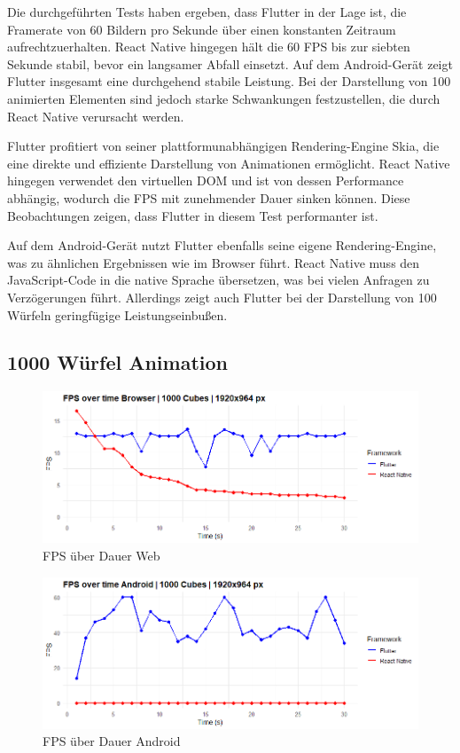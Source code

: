 Die durchgeführten Tests haben ergeben, dass Flutter in der Lage ist, die Framerate von 60 Bildern pro Sekunde über einen konstanten Zeitraum aufrechtzuerhalten. React Native hingegen hält die 60 FPS bis zur siebten Sekunde stabil, bevor ein langsamer Abfall einsetzt. Auf dem Android-Gerät zeigt Flutter insgesamt eine durchgehend stabile Leistung. Bei der Darstellung von 100 animierten Elementen sind jedoch starke Schwankungen festzustellen, die durch React Native verursacht werden.

Flutter profitiert von seiner plattformunabhängigen Rendering-Engine Skia, die eine direkte und effiziente Darstellung von Animationen ermöglicht. React Native hingegen verwendet den virtuellen DOM und ist von dessen Performance abhängig, wodurch die FPS mit zunehmender Dauer sinken können. Diese Beobachtungen zeigen, dass Flutter in diesem Test performanter ist.

Auf dem Android-Gerät nutzt Flutter ebenfalls seine eigene Rendering-Engine, was zu ähnlichen Ergebnissen wie im Browser führt. React Native muss den JavaScript-Code in die native Sprache übersetzen, was bei vielen Anfragen zu Verzögerungen führt. Allerdings zeigt auch Flutter bei der Darstellung von 100 Würfeln geringfügige Leistungseinbußen.

\newpage
\subsection{1000 Würfel Animation}

\begin{figure}[H]
    \centering
    \includegraphics[width=1\linewidth]{images/web/1000Cubes.png}
    \caption{FPS über Dauer Web}
\end{figure}

\begin{figure}[H]
    \centering
    \includegraphics[width=1\linewidth]{images/android/1000Cubes.png}
    \caption{FPS über Dauer Android}
\end{figure}

